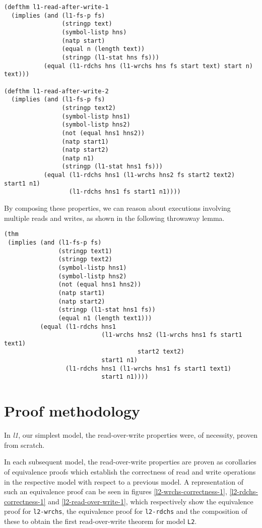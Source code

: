 \documentclass[runningheads,a4paper]{llncs}
\begin{document}
\noindent
\begin{verbatim}
(defthm l1-read-after-write-1
  (implies (and (l1-fs-p fs)
                (stringp text)
                (symbol-listp hns)
                (natp start)
                (equal n (length text))
                (stringp (l1-stat hns fs)))
           (equal (l1-rdchs hns (l1-wrchs hns fs start text) start n) text)))

(defthm l1-read-after-write-2
  (implies (and (l1-fs-p fs)
                (stringp text2)
                (symbol-listp hns1)
                (symbol-listp hns2)
                (not (equal hns1 hns2))
                (natp start1)
                (natp start2)
                (natp n1)
                (stringp (l1-stat hns1 fs)))
           (equal (l1-rdchs hns1 (l1-wrchs hns2 fs start2 text2) start1 n1)
                  (l1-rdchs hns1 fs start1 n1))))
\end{verbatim}

By composing these properties, we can reason about executions
involving multiple reads and writes, as shown in the following
throwaway lemma.

\medskip

\noindent
\begin{verbatim}
(thm
 (implies (and (l1-fs-p fs)
               (stringp text1)
               (stringp text2)
               (symbol-listp hns1)
               (symbol-listp hns2)
               (not (equal hns1 hns2))
               (natp start1)
               (natp start2)
               (stringp (l1-stat hns1 fs))
               (equal n1 (length text1)))
          (equal (l1-rdchs hns1
                           (l1-wrchs hns2 (l1-wrchs hns1 fs start1 text1)
                                     start2 text2)
                           start1 n1)
                 (l1-rdchs hns1 (l1-wrchs hns1 fs start1 text1)
                           start1 n1))))
\end{verbatim}

\section{Proof methodology}

In \textit{l1}, our simplest model, the read-over-write properties
were, of necessity, proven from scratch.

In each subsequent model, the read-over-write properties are proven as
corollaries of equivalence proofs which establish the correctness of
read and write operations in the respective model with respect to a
previous model. A representation of such an equivalence proof can be
seen in figures \ref{l2-wrchs-correctness-1},
\ref{l2-rdchs-correctness-1} and \ref{l2-read-over-write-1}, which
respectively show the equivalence proof for \texttt{l2-wrchs}, the
equivalence proof for \texttt{l2-rdchs} and the composition of these
to obtain the first read-over-write theorem for model \texttt{L2}.
\end{document}
